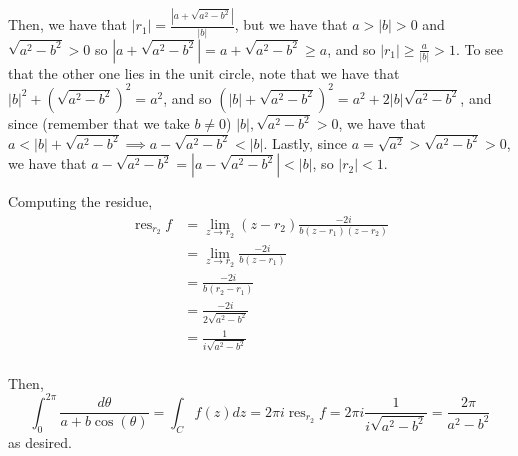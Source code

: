 \documentclass[12pt,letterpaper]{article}
\theoremstyle{definition}
\DeclareMathOperator{\res}{res}
\begin{document}
Then, we have that $|r_{1}| = \frac{|a + \sqrt{a^{2}-b^{2}}|}{|b|}$, but we have that $a > |b| > 0$ and $\sqrt{a^{2}-b^{2}} > 0$ so $|a + \sqrt{a^{2}-b^{2}}| = a + \sqrt{a^{2}-b^{2}} \geq a$, and so $|r_{1}| \geq \frac{a}{|b|} > 1$. To see that the other one lies in the unit circle, note that we have that $|b|^{2} + (\sqrt{a^{2}-b^{2}})^{2} = a^{2}$, and so $(|b| + \sqrt{a^{2}-b^{2}})^{2} = a^{2} + 2|b|\sqrt{a^{2}-b^{2}}$, and since (remember that we take $b \neq 0$) $|b|, \sqrt{a^{2}-b^{2}} > 0$, we have that $a < |b| + \sqrt{a^{2}-b^{2}} \implies a - \sqrt{a^{2}-b^{2}} < |b|$. Lastly, since $a =\sqrt{a^{2}} > \sqrt{a^{2}-b^{2}} > 0$, we have that $a - \sqrt{a^{2}-b^{2}} = |a - \sqrt{a^{2}-b^{2}}| < |b|$, so $|r_{2}| < 1$.

Computing the residue,
\begin{align*}
  \res_{r_{2}}f &= \lim_{z \rightarrow r_{2}} (z-r_{2})\frac{-2i}{b(z-r_{1})(z-r_{2})} \\
                &= \lim_{z \rightarrow r_{2}}\frac{-2i}{b(z-r_{1})}\\
                &= \frac{-2i}{b(r_{2}-r_{1})}\\
                &= \frac{-2i}{2\sqrt{a^{2}-b^{2}}}\\
                &= \frac{1}{i\sqrt{a^{2}-b^{2}}}\\
\end{align*}

Then,
\[
  \int_{0}^{2\pi}\frac{d\theta}{a + b\cos(\theta)} = \int_{C}f(z)dz = 2\pi i \res_{r_{2}}f = 2\pi i \frac{1}{i\sqrt{a^{2}-b^{2}}} = \frac{2\pi}{a^{2}-b^{2}}
\]
as desired.
\end{document}

